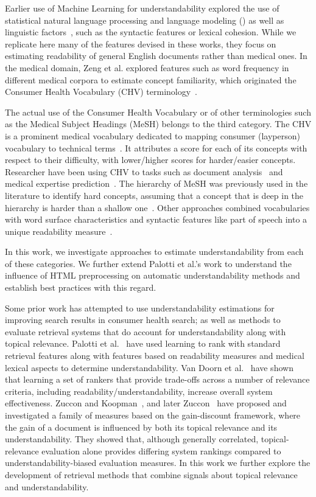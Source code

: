 Earlier use of Machine Learning for understandability explored the use of statistical natural language processing and language modeling (\cite{liu04,collins05,heilman07}) as well as linguistic factors~\cite{pitler08}, such as the syntactic features or lexical cohesion. While we replicate here many of the features devised in these works, they focus on estimating readability of general English documents rather than medical ones. In the medical domain, Zeng et al. explored features such as word frequency in different medical corpora to estimate concept familiarity, which originated the Consumer Health Vocabulary (CHV) terminology~\cite{zeng05,zeng06,zeng08}.  

The actual use of the Consumer Health Vocabulary or of other terminologies such as the Medical Subject Headings (MeSH) belongs to the third category. The CHV is a prominent medical vocabulary dedicated to mapping consumer (layperson) vocabulary to technical terms~\cite{zeng06}. It attributes a score for each of its concepts with respect to their difficulty, with lower/higher scores for harder/easier concepts. Researcher have been using CHV to tasks such as document analysis~\cite{leroy08} and medical expertise prediction~\cite{palotti14}.
The hierarchy of MeSH was previously used in the literature to identify hard concepts, assuming that a concept that is deep in the hierarchy is harder than a shallow one~\cite{yan11}. Other approaches combined vocabularies with word surface characteristics and syntactic features like part of speech into a unique readability measure~\cite{kim2007beyond}.

In this work, we investigate approaches to estimate understandability from each of these categories. We further extend Palotti et al.'s work to understand the influence of HTML preprocessing on automatic understandability methods and establish best practices with this regard. 

Some prior work has attempted to use understandability estimations for improving search results in consumer health search; as well as methods to evaluate retrieval systems that do account for understandability along with topical relevance. Palotti et al.~\cite{palotti2016ranking} have used learning to rank with standard retrieval features along with features based on readability measures and medical lexical aspects to determine
understandability. Van Doorn et al.~\cite{van2016balancing} have shown that learning a set of rankers that provide trade-offs across a number of relevance criteria, including readability/understandability, increase overall system effectiveness.   
Zuccon and Koopman~\cite{zuccon14}, and later Zuccon~\cite{zuccon2016understandability} have proposed and investigated a family of measures based on the gain-discount framework, where the gain of a document is influenced by both its topical relevance and its understandability. They showed that, although generally correlated, topical-relevance evaluation alone provides differing system rankings compared to understandability-biased evaluation measures. 
In this work we further explore the development of retrieval methods that combine signals about topical relevance and understandability. 


